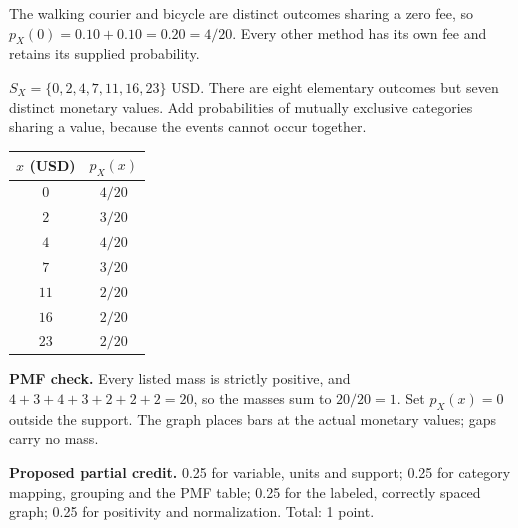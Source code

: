 The walking courier and bicycle are distinct outcomes sharing a zero fee, so $p_X(0)=0.10+0.10=0.20=4/20$. Every other method has its own fee and retains its supplied probability.

$S_X=\{0,2,4,7,11,16,23\}$ USD. There are eight elementary outcomes but seven distinct monetary values. Add probabilities of mutually exclusive categories sharing a value, because the events cannot occur together.

\begin{center}
\begin{tabular}{cc}\toprule
$x$ (USD) & $p_X(x)$\\\midrule
$0$ & $4/20$\\
$2$ & $3/20$\\
$4$ & $4/20$\\
$7$ & $3/20$\\
$11$ & $2/20$\\
$16$ & $2/20$\\
$23$ & $2/20$\\
\bottomrule\end{tabular}
\end{center}


\begin{center}\end{center}

\textbf{PMF check.} Every listed mass is strictly positive, and $4+3+4+3+2+2+2=20$, so the masses sum to $20/20=1$. Set $p_X(x)=0$ outside the support. The graph places bars at the actual monetary values; gaps carry no mass.

\textbf{Proposed partial credit.} 0.25 for variable, units and support; 0.25 for category mapping, grouping and the PMF table; 0.25 for the labeled, correctly spaced graph; 0.25 for positivity and normalization. Total: 1 point.

